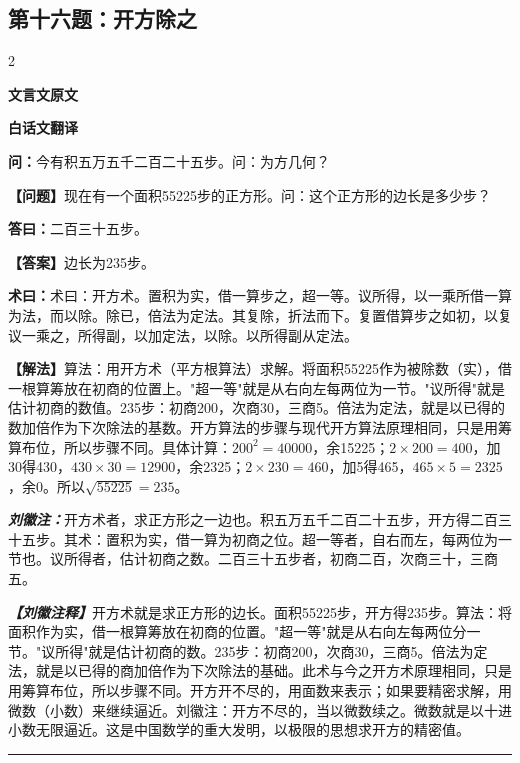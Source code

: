 \documentclass[10pt,a4paper]{article}
\newcommand{\wen}[1]{\textbf{\color{problemcolor}问：}#1\par}
\newcommand{\da}[1]{\textbf{答曰：}#1\par}
\newcommand{\shu}[1]{\textbf{术曰：}#1\par}
\newcommand{\liuhui}[1]{{\color{commentarycolor}\textit{\textbf{刘徽注：}}#1\par}}
\newcommand{\classicalheader}[1]{{\centering\large\bfseries\color{classicalcolor} #1\par\vspace{0.5em}}}
\newcommand{\wenmodern}[1]{\textbf{\color{moderncolor}【问题】}#1\par}
\newcommand{\damodern}[1]{\textbf{【答案】}#1\par}
\newcommand{\shumodern}[1]{\textbf{【解法】}#1\par}
\newcommand{\liuhuimodern}[1]{{\color{commentarycolor}\textit{\textbf{【刘徽注释】}}#1\par}}
\newcommand{\modernheader}[1]{{\centering\large\bfseries\color{moderncolor} #1\par\vspace{0.5em}}}
\newcommand{\problemsec}[1]{\subsection*{#1}}
\begin{document}
\problemsec{第十六题：开方除之}
\begin{paracol}{2}
\classicalheader{文言文原文}
\switchcolumn
\modernheader{白话文翻译}
\switchcolumn*

\wen{今有积五万五千二百二十五步。问：为方几何？}

\switchcolumn

\wenmodern{现在有一个面积55225步的正方形。问：这个正方形的边长是多少步？}

\switchcolumn*

\da{二百三十五步。}

\switchcolumn

\damodern{边长为235步。}

\switchcolumn*

\shu{术曰：开方术。置积为实，借一算步之，超一等。议所得，以一乘所借一算为法，而以除。除已，倍法为定法。其复除，折法而下。复置借算步之如初，以复议一乘之，所得副，以加定法，以除。以所得副从定法。}

\switchcolumn

\shumodern{算法：用开方术（平方根算法）求解。将面积55225作为被除数（实），借一根算筹放在初商的位置上。"超一等"就是从右向左每两位为一节。"议所得"就是估计初商的数值。235步：初商200，次商30，三商5。倍法为定法，就是以已得的数加倍作为下次除法的基数。开方算法的步骤与现代开方算法原理相同，只是用筹算布位，所以步骤不同。具体计算：$200^2=40000$，余15225；$2\times200=400$，加30得430，$430\times30=12900$，余2325；$2\times230=460$，加5得465，$465\times5=2325$，余0。所以$\sqrt{55225}=235$。}

\switchcolumn*

\liuhui{开方术者，求正方形之一边也。积五万五千二百二十五步，开方得二百三十五步。其术：置积为实，借一算为初商之位。超一等者，自右而左，每两位为一节也。议所得者，估计初商之数。二百三十五步者，初商二百，次商三十，三商五。}

\switchcolumn

\liuhuimodern{开方术就是求正方形的边长。面积55225步，开方得235步。算法：将面积作为实，借一根算筹放在初商的位置。"超一等"就是从右向左每两位分一节。"议所得"就是估计初商的数。235步：初商200，次商30，三商5。倍法为定法，就是以已得的商加倍作为下次除法的基础。此术与今之开方术原理相同，只是用筹算布位，所以步骤不同。开方开不尽的，用面数来表示；如果要精密求解，用微数（小数）来继续逼近。刘徽注：开方不尽的，当以微数续之。微数就是以十进小数无限逼近。这是中国数学的重大发明，以极限的思想求开方的精密值。}

\end{paracol}

\vspace{0.3cm}
\hrule
\vspace{0.3cm}
\end{document}
